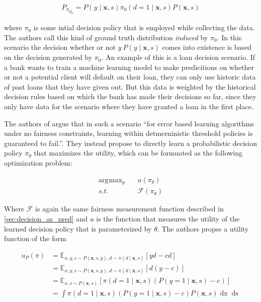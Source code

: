 \documentclass[
	a4paper,
	11pt
	]{article}
\DeclareMathOperator*{\argmax}{\arg\!\max}
\begin{document}
\begin{align*}
    P_{\pi_{Q_{0}}} = P(y \mid \boldsymbol{x}, s)\pi_{0}(d = 1 \mid \boldsymbol{x}, s)P(\boldsymbol{x}, s)
\end{align*}

where $\pi_{0}$ is some intial decision policy that is employed while collecting the data. The authors call this kind of ground truth distribution \textit{induced} by $\pi_0$. In this scenario the decision whether or not $y ~ P(y \mid \boldsymbol{x}, s)$ comes into existence is based on the decision generated by $\pi_{0}$. An example of this is a loan decision scenario. If a bank wants to train a machine learning model to make predicitions on whether or not a potential client will default on their loan, they can only use historic data of past loans that they have given out. But this data is weighted by the historical decision rules based on which the bank has made their decisions so far, since they only have data for the scenario where they have granted a loan in the first place.

The authors of \cite{Kilbertus19} argue that in such a scenario \enquote{for error based learning algorithms under no fairness constraints, learning within detmerninistic threshold policies is guaranteed to fail.}. They instead propose to directly learn a probabilistic decision policy $\pi_{\theta}$ that maximizes the utility, which can be formuated as the following optimization problem:

\begin{align*}
    \argmax_{\theta} &\quad u(\pi_{\theta}) \\
    s.t. &\quad \mathcal{F}(\pi_{\theta})
\end{align*}

Where $\mathcal{F}$ is again the same fairness measurement function described in \ref{sec:decision_as_pred} and $u$ is the function that measures the utility of the learned decision policy that is parameterized by $\theta$. The authors propse a utility function of the form 

\begin{align*}
    u_P(\pi) &= \mathbb{E}_{x,y,s \sim P(\boldsymbol{x}, s, y), d \sim \pi(d \mid \boldsymbol{x}, s)}[yd - cd] \\
    &= \mathbb{E}_{x,y,s \sim P(\boldsymbol{x}, s, y), d \sim \pi(d \mid \boldsymbol{x}, s)}[d(y - c)] \\
    &= \mathbb{E}_{x,s \sim P(\boldsymbol{x}, s)}[\pi(d = 1 \mid \boldsymbol{x}, s)(P(y = 1 \mid \boldsymbol{x}, s) - c)] \\
    &= \int \pi(d = 1 \mid \boldsymbol{x}, s)(P(y = 1 \mid \boldsymbol{x}, s) - c)P(\boldsymbol{x}, s) \mathop{dx} \mathop{ds}
\end{align*}
\end{document}
